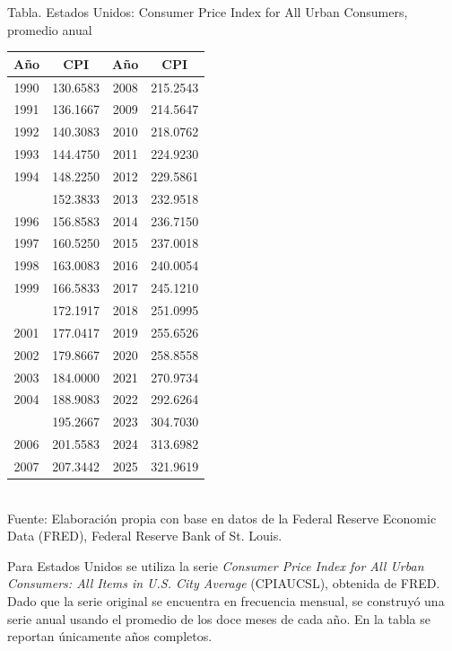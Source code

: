 \documentclass{article}\usepackage[]{graphicx}\usepackage[]{xcolor}
\begin{document}
\begin{center}
Tabla. Estados Unidos: Consumer Price Index for All Urban Consumers, promedio anual
\end{center}
\begin{center}

\begin{tabular}{cccc}
\toprule
Año & CPI & Año & CPI\\
\midrule
1990 & 130.6583 & 2008 & 215.2543\\
1991 & 136.1667 & 2009 & 214.5647\\
1992 & 140.3083 & 2010 & 218.0762\\
1993 & 144.4750 & 2011 & 224.9230\\
1994 & 148.2250 & 2012 & 229.5861\\
\addlinespace
1995 & 152.3833 & 2013 & 232.9518\\
1996 & 156.8583 & 2014 & 236.7150\\
1997 & 160.5250 & 2015 & 237.0018\\
1998 & 163.0083 & 2016 & 240.0054\\
1999 & 166.5833 & 2017 & 245.1210\\
\addlinespace
2000 & 172.1917 & 2018 & 251.0995\\
2001 & 177.0417 & 2019 & 255.6526\\
2002 & 179.8667 & 2020 & 258.8558\\
2003 & 184.0000 & 2021 & 270.9734\\
2004 & 188.9083 & 2022 & 292.6264\\
\addlinespace
2005 & 195.2667 & 2023 & 304.7030\\
2006 & 201.5583 & 2024 & 313.6982\\
2007 & 207.3442 & 2025 & 321.9619\\
\bottomrule
\end{tabular}
\\[0.3em]
{\footnotesize Fuente: Elaboración propia con base en datos de la Federal Reserve Economic Data (FRED), Federal Reserve Bank of St. Louis.}
\end{center}


Para Estados Unidos se utiliza la serie \textit{Consumer Price Index for All Urban Consumers: All Items in U.S. City Average} (CPIAUCSL), obtenida de FRED. Dado que la serie original se encuentra en frecuencia mensual, se construyó una serie anual usando el promedio de los doce meses de cada año. En la tabla se reportan únicamente años completos.
\end{document}
